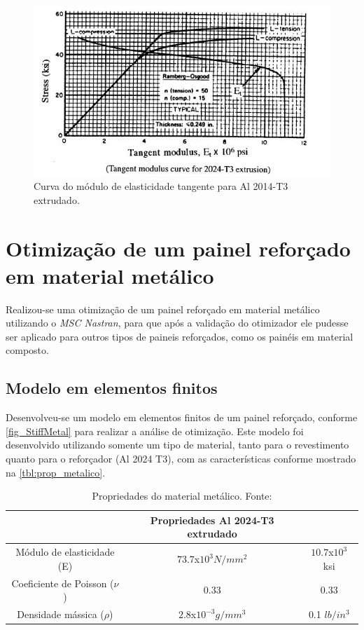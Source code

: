 {\begin{itemize}
\end{itemize}

\begin{figure}[ht]
	\caption{\label{fig_tangentmodulus}Curva do módulo de elasticidade tangente para Al 2014-T3 extrudado.}
  \centering
  \includegraphics[scale=1.0]{figura/TangentModulus}
\end{figure}

\section{Otimização de um painel reforçado em material metálico}
Realizou-se uma otimização de um painel reforçado em material metálico utilizando o \emph{MSC Nastran}, para que após a validação do otimizador ele pudesse ser aplicado para outros tipos de paineis reforçados, como os painéis em material composto.

\subsection{Modelo em elementos finitos}
Desenvolveu-se um modelo em elementos finitos de um painel reforçado, conforme \autoref{fig_StiffMetal} para realizar a análise de otimização. Este modelo foi desenvolvido utilizando somente um tipo de material, tanto para o revestimento quanto para o reforçador (Al 2024 T3), com as características conforme mostrado na \autoref{tbl:prop_metalico}.

\begin{table}[h]
\centering
\begin{tabular}{ccc}
\toprule
& Propriedades Al 2024-T3 extrudado \\ \midrule
Módulo de elasticidade (E) & $73.7$x$10^3N/mm^2$ & $10.7$x$10^3$ ksi \\
Coeficiente de Poisson ($\nu$) & 0.33 & 0.33\\
Densidade mássica ($\rho$)  & $2.8$x$10^{-3} g/mm^3$ & 0.1 $lb/in^3$ \\
\bottomrule
\end{tabular}
\caption{Propriedades do material metálico. Fonte:\cite{rice2003metallic}}
\label{tbl:prop_metalico}
\end{table}

}
